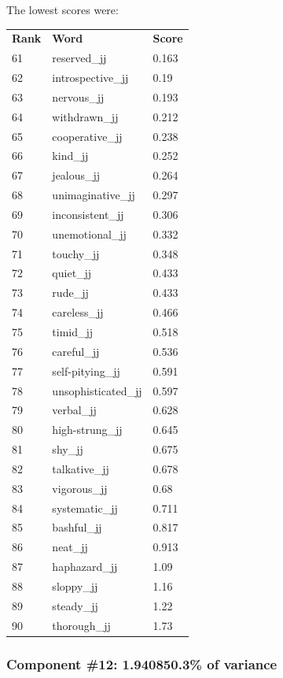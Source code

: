 \documentclass[10pt,letterpaper]{book}
\begin{document}
The lowest scores were:
\begin{tabular}{ l l l }
        \textbf{Rank} & \textbf{Word} & \textbf{Score} \\
        61 & reserved\_jj & 0.163 \\
        62 & introspective\_jj & 0.19 \\
        63 & nervous\_jj & 0.193 \\
        64 & withdrawn\_jj & 0.212 \\
        65 & cooperative\_jj & 0.238 \\
        66 & kind\_jj & 0.252 \\
        67 & jealous\_jj & 0.264 \\
        68 & unimaginative\_jj & 0.297 \\
        69 & inconsistent\_jj & 0.306 \\
        70 & unemotional\_jj & 0.332 \\
        71 & touchy\_jj & 0.348 \\
        72 & quiet\_jj & 0.433 \\
        73 & rude\_jj & 0.433 \\
        74 & careless\_jj & 0.466 \\
        75 & timid\_jj & 0.518 \\
        76 & careful\_jj & 0.536 \\
        77 & self-pitying\_jj & 0.591 \\
        78 & unsophisticated\_jj & 0.597 \\
        79 & verbal\_jj & 0.628 \\
        80 & high-strung\_jj & 0.645 \\
        81 & shy\_jj & 0.675 \\
        82 & talkative\_jj & 0.678 \\
        83 & vigorous\_jj & 0.68 \\
        84 & systematic\_jj & 0.711 \\
        85 & bashful\_jj & 0.817 \\
        86 & neat\_jj & 0.913 \\
        87 & haphazard\_jj & 1.09 \\
        88 & sloppy\_jj & 1.16 \\
        89 & steady\_jj & 1.22 \\
        90 & thorough\_jj & 1.73 \\
\end{tabular}
\subsubsection{Component \#12: 1.940850.3\% of variance}
\end{document}
